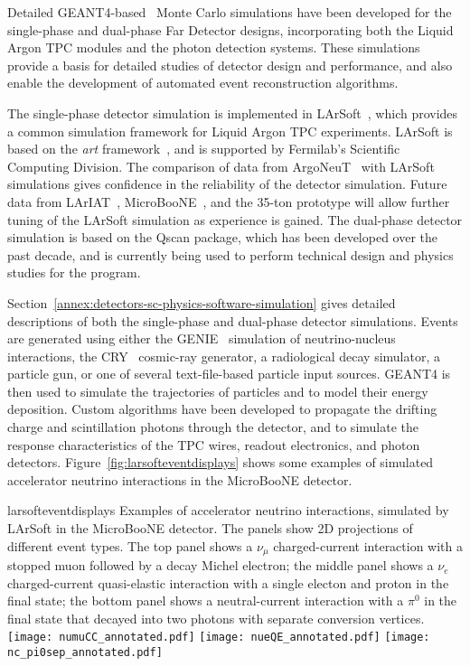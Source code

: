 Detailed GEANT4-based~\cite{GEANT4:NIM,GEANT4} Monte Carlo simulations have been 
developed for the single-phase and dual-phase Far Detector designs,
incorporating both the Liquid Argon TPC modules
and the photon detection systems. These simulations provide
a basis for detailed studies of detector design and performance, 
and also enable the development of automated event reconstruction algorithms.

The single-phase detector simulation is implemented in LArSoft~\cite{Church:2013hea},
which provides a common simulation framework for Liquid Argon TPC experiments.
LArSoft is based on the {\it art} framework~\cite{Green:2012gv}, and is supported by Fermilab's
Scientific Computing Division.
The comparison of data from ArgoNeuT~\cite{Anderson:2012vc} with LArSoft
simulations gives confidence in the reliability of the detector simulation.
Future data from LArIAT~\cite{Adamson:2013/02/28tla,Cavanna:2014iqa},
MicroBooNE~\cite{Chen:2007ae,Jones:2011ci,microboonecdr}, and the 35-ton prototype will allow
further tuning of the LArSoft simulation as experience is gained.
The dual-phase detector simulation is based on the Qscan package,
which has been developed over the past decade, and is currently
being used to perform technical design and physics studies for
the \cerndualproto{} program.

Section~\ref{annex:detectors-sc-physics-software-simulation} gives detailed
descriptions of both the single-phase and dual-phase detector simulations.
Events are generated using either the GENIE~\cite{GENIE} simulation of 
neutrino-nucleus interactions, the CRY~\cite{Cosmic-CRY,Cosmic-CRY-protons,CRY-url} cosmic-ray generator, 
a radiological decay simulator, a particle gun, or one of several
text-file-based particle input sources. GEANT4 is then used to simulate the trajectories
of particles and to model their energy deposition.  
Custom algorithms have been developed to propagate the drifting charge
and scintillation photons through the detector, and to simulate the
response characteristics of the TPC wires, readout electronics, and photon detectors.
Figure~\ref{fig:larsofteventdisplays} shows some examples of simulated 
accelerator neutrino interactions in the MicroBooNE detector.

\begin{cdrfigure}{larsofteventdisplays}
{Examples of accelerator neutrino interactions, simulated by LArSoft in the 
MicroBooNE detector. The panels show 2D projections of different event types.
The top panel shows a $\nu_{\mu}$ charged-current interaction with a stopped muon followed
by a decay Michel electron; the middle panel shows a $\nu_{e}$ charged-current 
quasi-elastic interaction with a single electon and proton in the final state;
the bottom panel shows a neutral-current interaction with a $\pi^{0}$ in the final state
that decayed into two photons with separate conversion vertices.}
\texttt{[image: numuCC\_annotated.pdf]}
\texttt{[image: nueQE\_annotated.pdf]}
\texttt{[image: nc\_pi0sep\_annotated.pdf]}
\end{cdrfigure}

